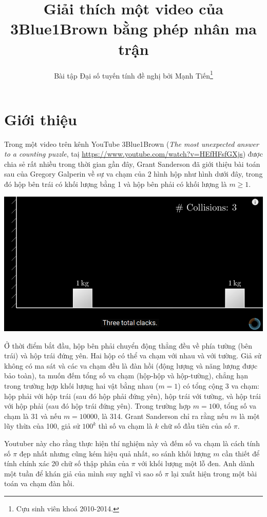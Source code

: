 \documentclass[11pt]{article}
\author{Bài tập Đại số tuyến tính đề nghị bởi Mạnh Tiến\footnote{Cựu sinh viên khoá 2010-2014.}}
\title{Giải thích một video của 3Blue1Brown bằng phép nhân ma trận}
\begin{document}
\maketitle
\section*{Giới thiệu}
\label{sec:orgc6dd89a}
Trong một video trên kênh YouTube 3Blue1Brown (\emph{The most unexpected answer to a counting puzzle}, taị
\url{https://www.youtube.com/watch?v=HEfHFsfGXjs}) được chia sẻ rất nhiều trong thời gian gần
đây, Grant Sanderson đã giới thiệu bài toán sau của Gregory
Galperin về sự va chạm của 2 hình hộp như hình dưới đây, trong đó hộp bên trái có khối
lượng bằng 1 và hộp bên phải có khối lượng là \(m \geq 1\).
\begin{center}
\includegraphics[width=.9\linewidth]{../img/3B1B-1.png}
\end{center}

Ở thời điểm bắt đầu, hộp bên phải chuyển động thẳng đều về phía tường (bên trái) và hộp trái đứng yên. Hai hộp
có thể va chạm với nhau và với tường. Giả sử không có ma sát và các va chạm đều
là đàn hồi (động lượng và năng lượng được bảo toàn), ta muốn đếm tổng số va chạm (hộp-hộp và
hộp-tường), chẳng hạn trong trường hợp khối lượng hai vật bằng nhau (\(m=1\)) có tổng
cộng 3 va chạm: hộp phải với hộp trái (sau đó hộp phải đứng yên), hộp trái với tường, và
hộp trái với hộp phải (sau đó hộp trái đứng yên). Trong trường hợp \(m=100\), tổng số va chạm
là 31 và nếu \(m=10000\), là 314. Grant Sanderson chỉ ra rằng nếu \(m\) là một lũy thừa của 100, giả sử \(100^k\) thì
số va chạm là \(k\) chữ số đầu tiên của số \(\pi\).

Youtuber này cho rằng thực hiện thí nghiệm này và đếm số va chạm là cách tính số \(\pi\)
đẹp nhất nhưng cũng kém hiệu quả nhất, so sánh khối lượng \(m\) cần thiết để
tính chính xác 20 chữ số thập phân của \(\pi\) với khối lượng một lỗ đen. Anh dành một
tuần để khán giả của mình suy nghĩ vì sao số \(\pi\) lại xuất hiện trong một bài toán va chạm đàn hồi.
\end{document}
